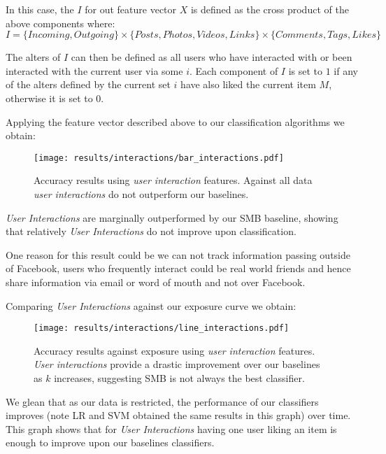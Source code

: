 In this case, the $I$ for out feature vector $X$ is defined as the cross product of the above components where:
\[ I = \{Incoming, Outgoing\} \times \{Posts,Photos,Videos,Links\} \times \{Comments,Tags,Likes\} \]

The alters of $I$ can then be defined as all users who have interacted with or been interacted with the current user via some $i$. 
Each component of $I$ is set to $1$ if any of the alters defined by the current set $i$ have also liked the current item $M$, otherwise 
it is set to $0$.

Applying the feature vector described above to our classification algorithms we obtain:

\begin{figure}[tbh!]
	\begin{center}
		\texttt{[image: results/interactions/bar\_interactions.pdf]}
		\caption{Accuracy results using \emph{user interaction} features. Against all data \emph{user interactions} do not outperform our baselines.}
	\end{center}
\end{figure}

\emph{User Interactions} are marginally outperformed by our SMB baseline, showing that relatively \emph{User Interactions} do not 
improve upon classification.

One reason for this result could be we can not track information passing outside of Facebook, users who frequently interact could be real 
world friends and hence share information via email or word of mouth and not over Facebook.

\clearpage

Comparing \emph{User Interactions} against our exposure curve we obtain:

\begin{figure}[tbh!]
	\begin{center}
		\texttt{[image: results/interactions/line\_interactions.pdf]}
		\caption{Accuracy results against exposure using \emph{user interaction} features. \emph{User interactions} provide a drastic improvement 
		over our baselines as $k$ increases, suggesting SMB is not always the best classifier.}
	\end{center}
\end{figure}

We glean that as our data is restricted, the performance of our classifiers improves (note LR and SVM obtained the same results in this graph) 
over time. This graph shows that for \emph{User Interactions} having one user liking an item is enough to improve upon our baselines classifiers.

